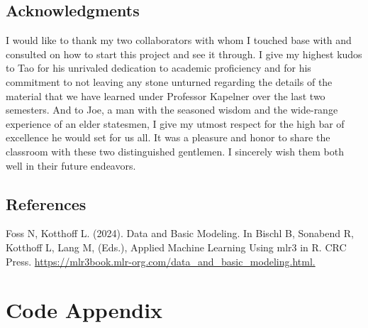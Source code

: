 \documentclass[12pt]{article}
\begin{document}
\subsection*{Acknowledgments}
\hspace{3mm}	 I would like to thank my two collaborators with whom I touched base with and consulted on how to start this project and see it through. I give my highest kudos to Tao for his unrivaled dedication to academic proficiency and for his commitment to not leaving any stone unturned regarding the details of the material that we have learned under Professor Kapelner over the last two semesters. And to Joe, a man with the seasoned wisdom and the wide-range experience of an elder statesmen, I give my utmost respect for the high bar of excellence he would set for us all. It was a pleasure and honor to share the classroom with these two distinguished gentlemen. I sincerely wish them both well in their future endeavors. 

\subsection*{References}

Foss N, Kotthoff L. (2024). Data and Basic Modeling. In Bischl B, Sonabend R, Kotthoff L, Lang M, (Eds.), Applied Machine Learning Using mlr3 in R. CRC Press. \url{https://mlr3book.mlr-org.com/data_and_basic_modeling.html.}

\newpage
\section*{Code Appendix}


\end{document}
